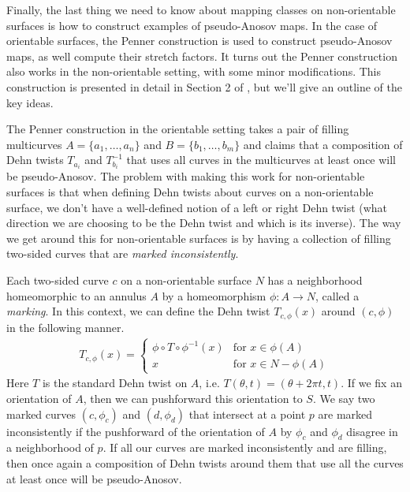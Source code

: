 Finally, the last thing we need to know about mapping classes on non-orientable surfaces is how to
construct examples of pseudo-Anosov maps. In the case of orientable surfaces, the Penner
construction is used to construct pseudo-Anosov maps, as well compute their stretch factors. It
turns out the Penner construction also works in the non-orientable setting, with some minor
modifications. This construction is presented in detail in Section 2 of \cite{Strenner_2017}, but
we'll give an outline of the key ideas.

The Penner construction in the orientable setting takes a pair of filling multicurves
$A = \{a_1,\dots,a_n\}$ and $B = \{b_1,\dots,b_m\}$ and claims that a composition of Dehn twists
$T_{a_i}$ and $T_{b_i}^{-1}$ that uses all curves in the multicurves at least once will be
pseudo-Anosov. The problem with making this work for non-orientable surfaces is that when defining
Dehn twists about curves on a non-orientable surface, we don't have a well-defined notion of a left
or right Dehn twist (what direction we are choosing to be the Dehn twist and which is its
inverse). The way we get around this for non-orientable surfaces is by having a collection of
filling two-sided curves that are \textit{marked inconsistently}.

Each two-sided curve $c$ on a non-orientable surface $N$ has a neighborhood homeomorphic to an
annulus $A$ by a homeomorphism $\phi: A \xrightarrow{} N$, called a \textit{marking}. In this
context, we can define the Dehn twist $T_{c,\phi}(x)$ around $(c,\phi)$ in the following manner.
\begin{align*}
  T_{c,\phi}(x) =
  \begin{cases}
    \phi \circ T \circ \phi^{-1}(x) & \text{for } x \in \phi(A) \\
    x & \text{for } x \in N - \phi(A)
  \end{cases}
\end{align*}
Here $T$ is the standard Dehn twist on $A$, i.e. $T(\theta,t) = (\theta + 2\pi t,t)$. If we fix an
orientation of $A$, then we can pushforward this orientation to $S$. We say two marked curves
$(c,\phi_c)$ and $(d,\phi_d)$ that intersect at a point $p$ are marked inconsistently if the
pushforward of the orientation of $A$ by $\phi_c$ and $\phi_d$ disagree in a neighborhood of $p$.
If all our curves are marked inconsistently and are filling, then once again a composition of Dehn
twists around them that use all the curves at least once will be pseudo-Anosov.

